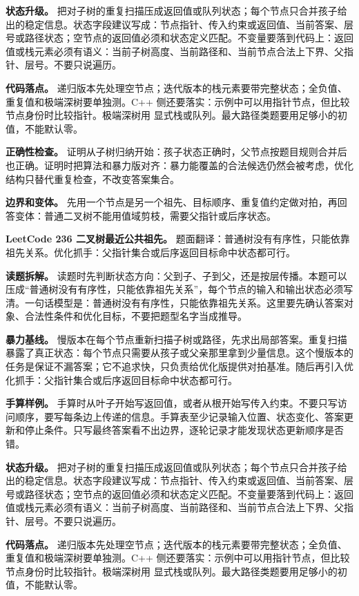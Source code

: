 \textbf{状态升级。} 把对子树的重复扫描压成返回值或队列状态；每个节点只合并孩子给出的稳定信息。状态字段建议写成：节点指针、传入约束或返回值、当前答案、层号或路径状态；空节点的返回值必须和状态定义匹配。不变量要落到代码上：返回值或栈元素必须有语义：当前子树高度、当前路径和、当前节点合法上下界、父指针、层号。不要只说遍历。

\textbf{代码落点。} 递归版本先处理空节点；迭代版本的栈元素要带完整状态；全负值、重复值和极端深树要单独测。C++ 侧还要落实：示例中可以用指针节点，但比较节点身份时比较指针。极端深树用  显式栈或队列。最大路径类题要用足够小的初值，不能默认零。

\textbf{正确性检查。} 证明从子树归纳开始：孩子状态正确时，父节点按题目规则合并后也正确。证明时把算法和暴力版对齐：暴力能覆盖的合法候选仍然会被考虑，优化结构只替代重复检查，不改变答案集合。

\textbf{边界和变体。} 先用一个节点是另一个祖先、目标顺序、重复值约定做对拍，再回答变体：普通二叉树不能用值域剪枝，需要父指针或后序状态。

\noindent\textbf{LeetCode 236 二叉树最近公共祖先。} 题面翻译：普通树没有有序性，只能依靠祖先关系。优化抓手：父指针集合或后序返回目标命中状态都可行。

\textbf{读题拆解。} 读题时先判断状态方向：父到子、子到父，还是按层传播。本题可以压成“普通树没有有序性，只能依靠祖先关系”，每个节点的输入和输出状态必须写清。一句话模型是：普通树没有有序性，只能依靠祖先关系。这里要先确认答案对象、合法性条件和优化目标，不要把题型名字当成推导。

\textbf{暴力基线。} 慢版本在每个节点重新扫描子树或路径，先求出局部答案。重复扫描暴露了真正状态：每个节点只需要从孩子或父亲那里拿到少量信息。这个慢版本的任务是保证不漏答案；它不追求快，只负责给优化版提供对拍基准。随后再引入优化抓手：父指针集合或后序返回目标命中状态都可行。

\textbf{手算样例。} 手算时从叶子开始写返回值，或者从根开始写传入约束。不要只写访问顺序，要写每条边上传递的信息。手算表至少记录输入位置、状态变化、答案更新和停止条件。只写最终答案看不出边界，逐轮记录才能发现状态更新顺序是否错。

\textbf{状态升级。} 把对子树的重复扫描压成返回值或队列状态；每个节点只合并孩子给出的稳定信息。状态字段建议写成：节点指针、传入约束或返回值、当前答案、层号或路径状态；空节点的返回值必须和状态定义匹配。不变量要落到代码上：返回值或栈元素必须有语义：当前子树高度、当前路径和、当前节点合法上下界、父指针、层号。不要只说遍历。

\textbf{代码落点。} 递归版本先处理空节点；迭代版本的栈元素要带完整状态；全负值、重复值和极端深树要单独测。C++ 侧还要落实：示例中可以用指针节点，但比较节点身份时比较指针。极端深树用  显式栈或队列。最大路径类题要用足够小的初值，不能默认零。

